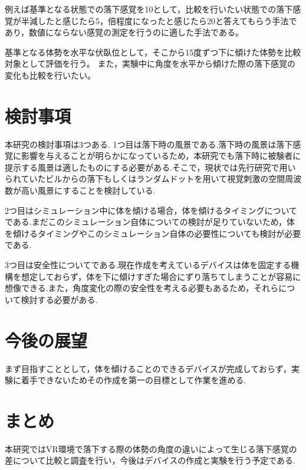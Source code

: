 \documentclass[uplatex]{jsarticle}
\begin{document}
例えば基準となる状態での落下感覚を10として，比較を行いたい状態での落下感覚が半減したと感じたら5，倍程度になったと感じたら20と答えてもらう手法であり，数値にならない感覚の測定を行うのに適した手法である。

基準となる体勢を水平な伏臥位として，そこから15度ずつ下に傾けた体勢を比較対象として評価を行う。
また，実験中に角度を水平から傾けた際の落下感覚の変化も比較を行いたい。

\section{検討事項}
本研究の検討事項は3つある.
1つ目は落下時の風景である.落下時の風景は落下感覚に影響を与えることが明らかになっているため，本研究でも落下時に被験者に提示する風景は適したものにする必要がある.そこで，現状では先行研究で用いられていたビルからの落下もしくはランダムドットを用いて視覚刺激の空間周波数が高い風景にすることを検討している.

2つ目はシミュレーション中に体を傾ける場合，体を傾けるタイミングについてである.まだこのシミュレーション自体についての検討が足りていないため，体を傾けるタイミングやこのシミュレーション自体の必要性についても検討が必要である.

3つ目は安全性についてである.現在作成を考えているデバイスは体を固定する機構を想定しておらず，体を下に傾けすぎた場合にずり落ちてしまうことが容易に想像できる.また，角度変化の際の安全性を考える必要もあるため，それらについて検討する必要がある.

\section{今後の展望}
まず目指すこととして，体を傾けることのできるデバイスが完成しておらず，実験に着手できないためその作成を第一の目標として作業を進める.

\section{まとめ}
本研究ではVR環境で落下する際の体勢の角度の違いによって生じる落下感覚の差について比較と調査を行い，今後はデバイスの作成と実験を行う予定である.


 
\end{document}
